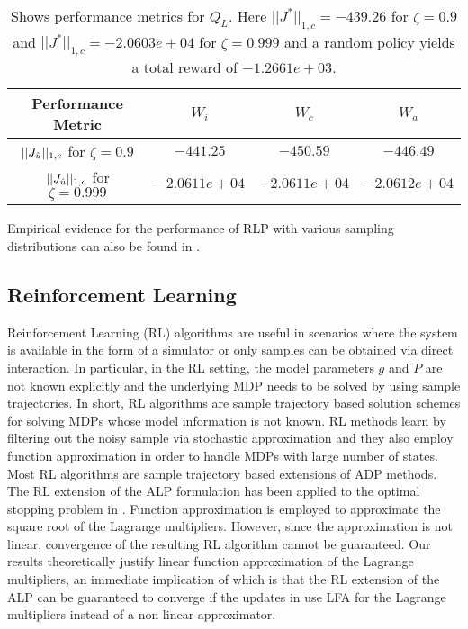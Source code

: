 \documentclass[12pt,draftcls,onecolumn]{IEEEtran}
\begin{document}
\FloatBarrier
\begin{table}[H]
\begin{tabular}{|c|c|c|c|}\hline
Performance Metric&	$W_i$&	$W_c$& $W_a$ \\\hline
$||J_{\hat{u}}||_{1,c}$ for $\zeta=0.9$& $-441.25$&	$-450.59$& $-446.49$ \\\hline
$||J_{\hat{u}}||_{1,c}$ for $\zeta=0.999$& $-2.0611e+04$&	$-2.0611e+04$& $-2.0612e+04$ \\\hline
\end{tabular}
\caption{Shows performance metrics for $Q_L$. Here $||J^*||_{1,c}=-439.26$ for $\zeta=0.9$ and $||J^*||_{1,c}=-2.0603e+04$ for $\zeta=0.999$   and a random policy yields a total reward of $-1.2661e+03
$.}
\label{pref}
\end{table}
Empirical evidence for the performance of RLP with various sampling distributions can also be found in \cite{CST,CS}.
\subsection{Reinforcement Learning}
Reinforcement Learning (RL) algorithms are useful in scenarios where the system is available in the form of a simulator or only samples can be obtained via direct interaction. In particular, in the RL setting, the model parameters $g$ and $P$ are not known explicitly and the underlying MDP needs to be solved by using sample trajectories. In short, RL algorithms are sample trajectory based solution schemes for solving MDPs whose model information is not known. RL methods learn by filtering out the noisy sample via stochastic approximation and they also employ function approximation in order to handle MDPs with large number of states. Most RL algorithms are sample trajectory based extensions of ADP methods.\\
The RL extension of the ALP formulation has been applied to the optimal stopping problem in \cite{ALP-Bor}. Function approximation is employed to approximate the square root of the Lagrange multipliers. However, since the approximation is not linear, convergence of the resulting RL algorithm cannot be guaranteed. Our results theoretically justify linear function approximation of the Lagrange multipliers, an immediate implication of which is that the RL extension of the ALP can be guaranteed to converge if the updates in \cite{ALP-Bor} use LFA for the Lagrange multipliers instead of a non-linear approximator.
\end{document}
